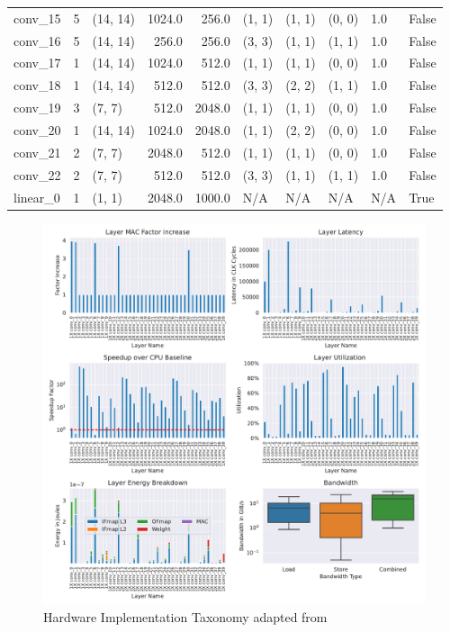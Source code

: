 \begin{center}
\begin{tabular}{lrlrrlllll}
        conv\_15  & 5 &    (14, 14) &  1024.0 &   256.0 &  (1, 1) &  (1, 1) &  (0, 0) &    1.0 &  False \\
        conv\_16  & 5 &    (14, 14) &   256.0 &   256.0 &  (3, 3) &  (1, 1) &  (1, 1) &    1.0 &  False \\
        conv\_17  & 1 &    (14, 14) &  1024.0 &   512.0 &  (1, 1) &  (1, 1) &  (0, 0) &    1.0 &  False \\
        conv\_18  & 1 &    (14, 14) &   512.0 &   512.0 &  (3, 3) &  (2, 2) &  (1, 1) &    1.0 &  False \\
        conv\_19  & 3 &      (7, 7) &   512.0 &  2048.0 &  (1, 1) &  (1, 1) &  (0, 0) &    1.0 &  False \\
        conv\_20  & 1 &    (14, 14) &  1024.0 &  2048.0 &  (1, 1) &  (2, 2) &  (0, 0) &    1.0 &  False \\
        conv\_21  & 2 &      (7, 7) &  2048.0 &   512.0 &  (1, 1) &  (1, 1) &  (0, 0) &    1.0 &  False \\
        conv\_22  & 2 &      (7, 7) &   512.0 &   512.0 &  (3, 3) &  (1, 1) &  (1, 1) &    1.0 &  False \\
        linear\_0 & 1 &      (1, 1) &  2048.0 &  1000.0 &     N/A &     N/A &     N/A &    N/A &   True \\
        \bottomrule
        \end{tabular}
\end{center}

\begin{figure}[ht]
    \centering
    \includegraphics[scale=0.6]{Plots/networks/mobilenetv3_small_075.pdf}
    \caption{Hardware Implementation Taxonomy adapted from \cite{maestro}}
    \label{fig:hw_taxonomy}
\end{figure}

